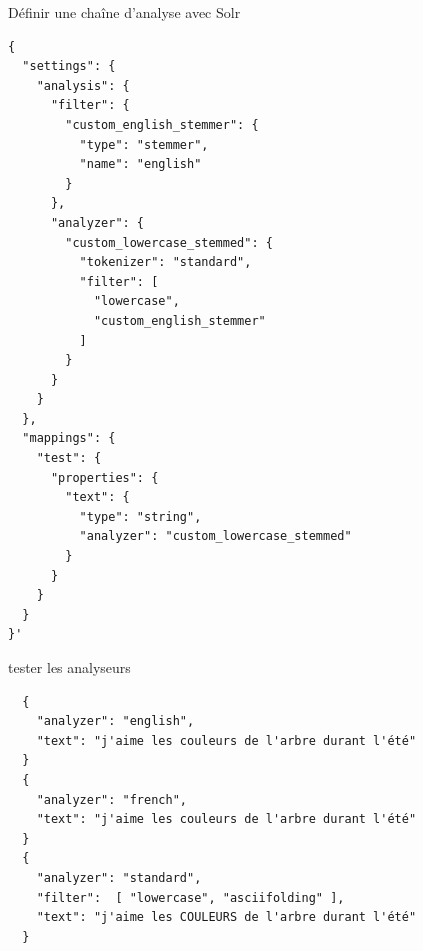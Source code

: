 \begin{frame}[fragile]{Définir une chaîne d'analyse avec Solr}
\begin{verbatim}
{
  "settings": {
    "analysis": {
      "filter": {
        "custom_english_stemmer": {
          "type": "stemmer",
          "name": "english"
        }
      },
      "analyzer": {
        "custom_lowercase_stemmed": {
          "tokenizer": "standard",
          "filter": [
            "lowercase",
            "custom_english_stemmer"
          ]
        }
      }
    }
  },
  "mappings": {
    "test": {
      "properties": {
        "text": {
          "type": "string",
          "analyzer": "custom_lowercase_stemmed"
        }
      }
    }
  }
}'
\end{verbatim}
	
\end{frame}



\begin{frame}[fragile]{tester les analyseurs}
\begin{verbatim}
  {                                                                               
    "analyzer": "english",                                                        
    "text": "j'aime les couleurs de l'arbre durant l'été"                         
  }                                                                               
  {                                                                               
    "analyzer": "french",                                                         
    "text": "j'aime les couleurs de l'arbre durant l'été"                         
  }                                                                               
  {                                                                               
    "analyzer": "standard",                                                       
    "filter":  [ "lowercase", "asciifolding" ],                                   
    "text": "j'aime les COULEURS de l'arbre durant l'été"                         
  }   
\end{verbatim}

\end{frame}

